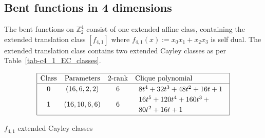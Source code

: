 \documentclass[12pt,a4paper]{article}
\newcommand{\mb}[1]{\mathbb{#1}}
\newcommand{\Z}{\mb{Z}}
\begin{document}
\subsection{Bent functions in 4 dimensions}
%
The bent functions on $\Z_2^4$ consist of one extended affine class, containing the extended translation class $[f_{4,1}]$ where
$f_{4,1}(x) := x_0 x_1 + x_2 x_3$ is self dual.
The extended translation class contains two extended Cayley classes as per Table~\ref{tab-c4_1_EC_classes}.
\begin{table}[!bhpt] %
\small{
\begin{align*}
\def\arraystretch{1.2}
\begin{array}{|cccl|}
\hline
\text{Class} &
\text{Parameters} &
\text{2-rank} &
\text{Clique polynomial}
\\
\hline
0 &
(16, 6, 2, 2) &
6 &
\begin{array}{l}
8t^{4} + 32t^{3} + 48t^{2} + 16t + 1
\end{array}
\\
1 &
(16, 10, 6, 6) &
6 &
\begin{array}{l}
16t^{5} + 120t^{4} + 160t^{3}
\,+
\\
 80t^{2} + 16t + 1
\end{array}
\\
\hline
\end{array}
\end{align*}
}
\caption{$f_{4,1}$ extended Cayley classes}
\label{tab-c4_1_EC_classes}
\end{table}

%
\end{document}
